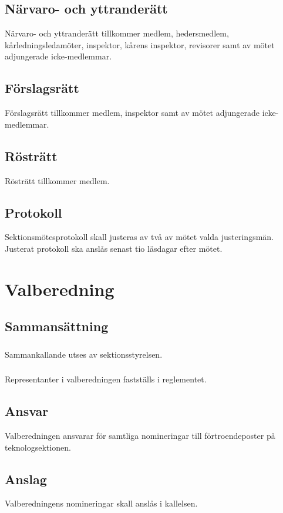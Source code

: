 \documentclass[a4paper]{dtek}
\begin{document}
\subsection{Närvaro- och yttranderätt}
Närvaro- och yttranderätt tillkommer medlem, hedersmedlem, kårledningsledamöter, inspektor, kårens inspektor, revisorer samt av mötet adjungerade icke-medlemmar.
\subsection{Förslagsrätt}
Förslagsrätt tillkommer medlem, inspektor samt av mötet adjungerade icke-medlemmar.
\subsection{Rösträtt}
Rösträtt tillkommer medlem.
\subsection{Protokoll}
Sektionsmötesprotokoll skall justeras av två av mötet valda justeringsmän. Justerat protokoll ska anslås senast tio läsdagar efter mötet.
\newpage

\section{Valberedning}
\subsection{Sammansättning}
\subsubsection{}
Sammankallande utses av sektionsstyrelsen.
\subsubsection{}
Representanter i valberedningen fastställs i reglementet.
\subsection{Ansvar}
Valberedningen ansvarar för samtliga nomineringar till förtroendeposter på teknologsektionen.
\subsection{Anslag}
Valberedningens nomineringar skall anslås i kallelsen.
\end{document}

